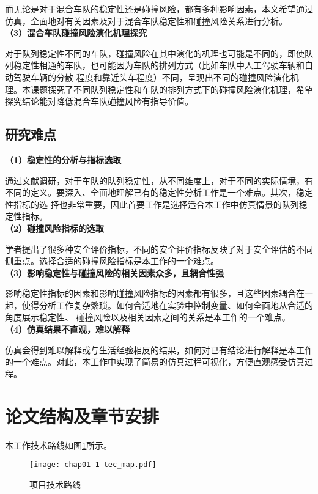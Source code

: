 而无论是对于混合车队的稳定性还是碰撞风险，都有多种影响因素，本文希望通过仿真，全面地对有关因素及对于混合车队稳定性和碰撞风险关系进行分析。\\

\noindent \textbf{（3）混合车队碰撞风险演化机理探究}

对于队列稳定性不同的车队，碰撞风险在其中演化的机理也可能是不同的，即使队列稳定性相通的车队，也可能因为车队的排列方式（比如车队中人工驾驶车辆和自动驾驶车辆的分散
程度和靠近头车程度）不同，呈现出不同的碰撞风险演化机理。本课题探究了不同队列稳定性和车队的排列方式下的碰撞风险演化机理，希望探究结论能对降低混合车队碰撞风险有指导价值。

\subsection{研究难点}

\noindent \textbf{（1）稳定性的分析与指标选取}

通过文献调研，对于车队的队列稳定性，从不同维度上，对于不同的实际情境，有不同的定义。要深入、全面地理解已有的稳定性分析工作是一个难点。其次，稳定性指标的选
择也非常重要，因此首要工作是选择适合本工作中仿真情景的队列稳定性指标。\\

\noindent \textbf{（2）碰撞风险指标的选取}

学者提出了很多种安全评价指标，不同的安全评价指标反映了对于安全评估的不同侧重点。选择合适的碰撞风险指标是本工作的一个难点。 \\

\noindent \textbf{（3）影响稳定性与碰撞风险的相关因素众多，且耦合性强}

影响稳定性指标的因素和影响碰撞风险指标的因素都有很多，且这些因素耦合在一起，使得分析工作复杂繁琐。如何合适地在实验中控制变量、如何全面地从合适的角度展示稳定性、
碰撞风险以及相关因素之间的关系是本工作的一个难点。\\

\noindent \textbf{（4）仿真结果不直观，难以解释}

仿真会得到难以解释或与生活经验相反的结果，如何对已有结论进行解释是本工作的一个难点。对此，本工作中实现了简易的仿真过程可视化，方便直观感受仿真过程。

\section{论文结构及章节安排}

本工作技术路线如图\ref{fig:chap01-1}所示。

\begin{figure}
  \centering
  \texttt{[image: chap01-1-tec\_map.pdf]}
  \caption{项目技术路线}
  \label{fig:chap01-1}
\end{figure}


